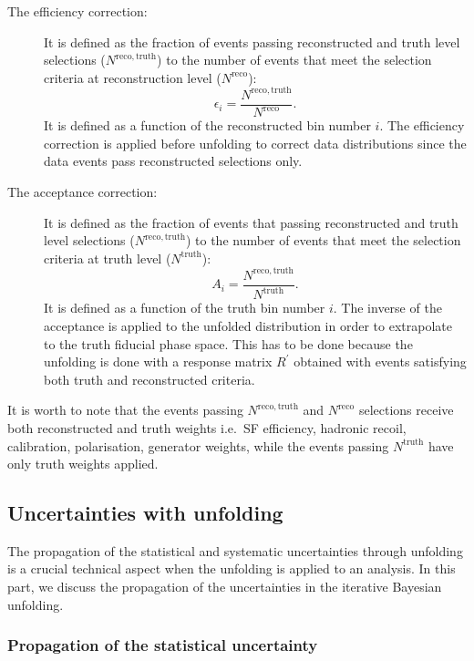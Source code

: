 \begin{description}
\item[The efficiency correction:] It is defined as the fraction of events passing reconstructed and truth level selections ($N^\mathrm{reco, truth}$) to the number of events that meet the selection criteria at reconstruction level ($N^\mathrm{reco}$):
\begin{equation}
\epsilon_{i} = \frac{N^\mathrm{reco, truth}}{N^\mathrm{reco}}.
\end{equation}
It is defined as a function of the reconstructed bin number $i$. The efficiency correction is applied before unfolding to correct data distributions since the data events pass reconstructed selections only. 
%
\item[The acceptance correction:] It is defined as the fraction of events that passing reconstructed and truth level selections ($N^\mathrm{reco, truth}$) to the number of events that meet the selection criteria at truth level ($N^\mathrm{truth}$):
\begin{equation}
A_{i} = \frac{N^\mathrm{reco, truth}}{N^\mathrm{truth}}.
\end{equation}
%
It is defined as a function of the truth bin number $i$. The inverse of the acceptance is applied to the unfolded distribution in order to extrapolate to the truth fiducial phase space. This has to be done because the unfolding is done with a response matrix $R^\prime$ obtained with events satisfying both truth and reconstructed criteria.
\end{description}

\noindent It is worth to note that the events passing $N^\mathrm{reco, truth}$ and $N^\mathrm{reco}$ selections receive both reconstructed and truth weights i.e.\ SF efficiency, hadronic recoil, calibration, polarisation, generator weights, while the events passing $N^\mathrm{truth}$ have only truth weights applied. 




\subsection{Uncertainties with unfolding}

The propagation of the statistical and systematic uncertainties through unfolding is a crucial technical aspect when the unfolding is applied to an analysis. In this part, we discuss the propagation of the uncertainties in the iterative Bayesian unfolding.

\subsubsection{Propagation of the statistical uncertainty}



